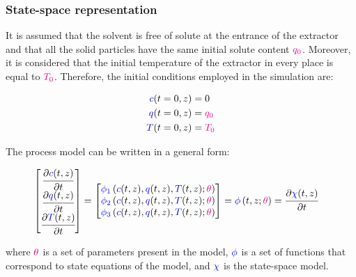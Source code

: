 \documentclass[../Parameter_fitting.tex]{subfiles}
\begin{document}
			\subsubsection{State-space representation} \label{CH: State_space}
			It is assumed that the solvent is free of solute at the entrance of the extractor and that all the solid particles have the same initial solute content ${\color{magenta}q_0}$. Moreover, it is considered that the initial temperature of the extractor in every place is equal to ${\color{magenta}T_0}$. Therefore, the initial conditions employed in the simulation are:
			
			{\footnotesize
				\begin{subequations}
					\begin{align*}
						{\color{blue}c}(t = 0, z) &= 0   \\
						{\color{blue}q}(t = 0, z) &= {\color{magenta}q_0} \\
						{\color{blue}T}(t = 0, z) &= {\color{magenta}T_0}
					\end{align*}
			\end{subequations} }
			
			The process model can be written in a general form:
			
			{\footnotesize
				\begin{align}
					\begin{bmatrix}
						\cfrac{\partial {\color{blue}c}(t,z)}{\partial t}\\
						\cfrac{\partial {\color{blue}q}(t,z)}{\partial t}\\
						\cfrac{\partial {\color{blue}T}(t,z)}{\partial t} 
					\end{bmatrix}
					& =
					\begin{bmatrix}
						{\color{blue}\phi_1} \left( {\color{blue}c}(t,z),{\color{blue}q}(t,z),{\color{blue}T}(t,z); {\color{magenta}\theta} \right)\\
						{\color{blue}\phi_2} \left( {\color{blue}c}(t,z),{\color{blue}q}(t,z),{\color{blue}T}(t,z); {\color{magenta}\theta} \right)\\
						{\color{blue}\phi_3} \left( {\color{blue}c}(t,z),{\color{blue}q}(t,z),{\color{blue}T}(t,z); {\color{magenta}\theta} \right)
					\end{bmatrix} = {\color{blue}\phi} \left( t,z; {\color{magenta}\theta} \right) = \cfrac{\partial {\color{blue}\chi}(t,z)}{\partial t}
			\end{align} }
			
			where ${\color{magenta}\theta}$ is a set of parameters present in the model, ${\color{blue}\phi}$ is a set of functions that correspond to state equations of the model, and ${\color{blue}\chi}$ is the state-space model.
			
\end{document}
